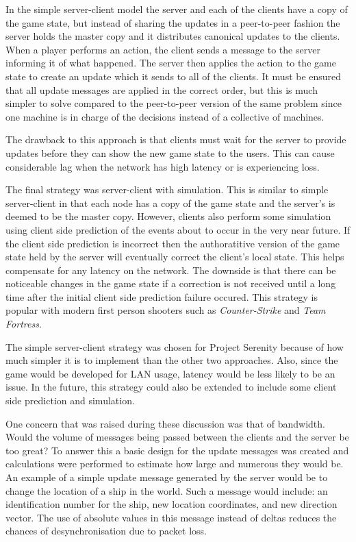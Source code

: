 In the simple server-client model the server and each of the clients have a copy of the game state, but instead of sharing the updates in a peer-to-peer fashion the server holds the master copy and it distributes canonical updates to the clients. When a player performs an action, the client sends a message to the server informing it of what happened. The server then applies the action to the game state to create an update which it sends to all of the clients. It must be ensured that all update messages are applied in the correct order, but this is much simpler to solve compared to the peer-to-peer version of the same problem since one machine is in charge of the decisions instead of a collective of machines.

The drawback to this approach is that clients must wait for the server to provide updates before they can show the new game state to the users. This can cause considerable lag when the network has high latency or is experiencing loss.

The final strategy was server-client with simulation. This is similar to simple server-client in that each node has a copy of the game state and the server's is deemed to be the master copy. However, clients also perform some simulation using client side prediction of the events about to occur in the very near future. If the client side prediction is incorrect then the authoratitive version of the game state held by the server will eventually correct the client's local state. This helps compensate for any latency on the network. The downside is that there can be noticeable changes in the game state if a correction is not received until a long time after the initial client side prediction failure occured. This strategy is popular with modern first person shooters such as \emph{Counter-Strike} and \emph{Team Fortress}.\cite{bernier2001simulation}

The simple server-client strategy was chosen for Project Serenity because of how much simpler it is to implement than the other two approaches. Also, since the game would be developed for LAN usage, latency would be less likely to be an issue. In the future, this strategy could also be extended to include some client side prediction and simulation.

One concern that was raised during these discussion was that of bandwidth. Would the volume of messages being passed between the clients and the server be too great? To answer this a basic design for the update messages was created and calculations were performed to estimate how large and numerous they would be. An example of a simple update message generated by the server would be to change the location of a ship in the world. Such a message would include: an identification number for the ship, new location coordinates, and new direction vector. The use of absolute values in this message instead of deltas reduces the chances of desynchronisation due to packet loss.

